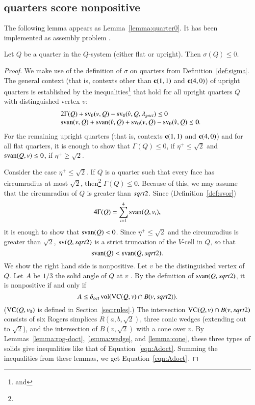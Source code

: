 \subsection{quarters score nonpositive}

The following lemma appears as Lemma~\ref{lemma:quarter0}.
It has been implemented as assembly problem .


\begin{lemma}\label{lemma:quarter0}
Let $Q$ be a quarter in the $Q$-system (either flat or upright).
Then $\sigma(Q)\le 0$. 
\end{lemma}


\begin{proof}  
We make use
of the definition of $\sigma$ on quarters from
Definition~\ref{def:sigma}. The general context (that is, contexts
other than ${\operatorname{\bf c}}{(1,1)}$ and ${\operatorname{\bf c}}{(4,0)}$) of upright quarters is established
by the inequalities\footnote{ and
} that hold for all upright quarters $Q$ with
distinguished vertex $v$:
    $$
    \begin{array}{lll}
    &2\Gamma(Q) + {\operatorname{sv}}_0(v,Q) - {\operatorname{sv}}_0(\hat v,Q,\lambda_{goct}) \le 0\\
    &{\operatorname{svan}}(v,Q) + {\operatorname{svan}}(\hat v,Q) 
  +{\operatorname{sv}}_0(v,Q) - {\operatorname{sv}}_0(\hat v,Q)\le0.
    \end{array}
    $$
For the remaining upright quarters (that is, contexts ${\operatorname{\bf c}}{(1,1)}$ and ${\operatorname{\bf c}}{(4,0)}$)
and for all flat quarters,
it is enough to show that $\Gamma(Q)\le0$, if $\eta^+\le\sqrt2$ and
${\operatorname{svan}}(Q,v)\le0$, if $\eta^+\ge\sqrt2$.

Consider the case $\eta^+\le\sqrt2$.  If $Q$ is a quarter such that
every face has circumradius at most $\sqrt2$,
then\footnote{} $\Gamma(Q)\le0$.  
Because of this, we may assume that the circumradius of $Q$ is
greater than $sqrt2$. 
Since
(Definition~\ref{def:svor})
    $$4\Gamma(Q)=\sum_{i=1}^4 {\operatorname{svan}}(Q,v_i),$$
it is enough to show that ${\operatorname{svan}}(Q)<0$.  Since $\eta^+\le\sqrt2$ 
and the circumradius is greater than
$\sqrt2$, ${\operatorname{sv}}(Q,sqrt2)$ is a strict truncation of the $V$-cell
in $Q$, so that
    $${\operatorname{svan}}(Q)<{\operatorname{svan}}(Q,sqrt2).$$
We show the right hand side is nonpositive.  Let $v$ be the
distinguished vertex of $Q$.  Let $A$ be $1/3$ the solid angle of
$Q$ at $v$ . By the definition of ${\operatorname{svan}}(Q,sqrt2)$, it is
nonpositive if and only if
    \begin{equation}
        A\le \delta_{oct} \,{\operatorname{vol}}({\operatorname{VC}}(Q,v)\cap B(v,sqrt2)).
        \label{eqn:Adoct}
    \end{equation}
(${\operatorname{VC}}(Q,v_0)$ is defined in Section~\ref{sec:rules}.) The
intersection ${\operatorname{VC}}(Q,v)\cap B(v,sqrt2)$ consists of six Rogers
simplices $R(a,b,\sqrt2)$, three conic wedges (extending out to
$\sqrt2$), and the intersection of $B(v,\sqrt2)$ with a cone over
$v$. By Lemmas~\ref{lemma:rog-doct}, \ref{lemma:wedge}, and
\ref{lemma:cone}, these three types of solids give inequalities like
that of Equation~\ref{eqn:Adoct}. Summing the inequalities from
these lemmas, we get Equation~\ref{eqn:Adoct}.


\end{proof}
